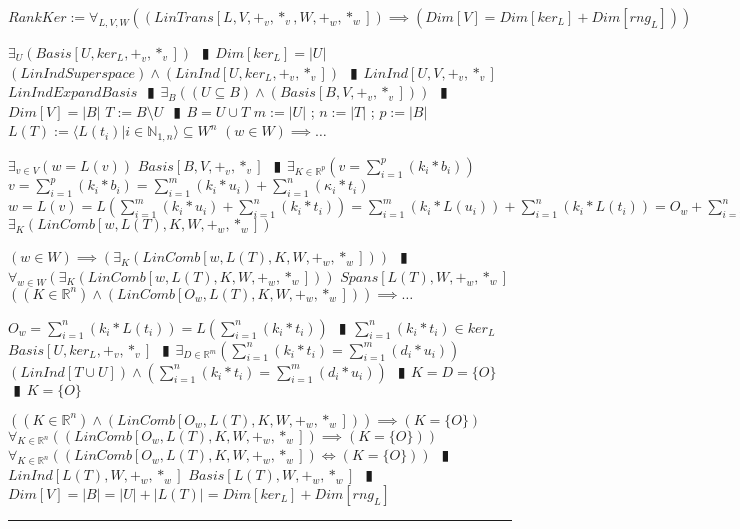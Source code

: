 \documentclass{book}
\newcommand{\abr}{:=}
\newcommand{\pipe}{$\phantom{(}\vrectangleblack\phantom{)}$}
\begin{document}
$RankKer \abr \forall_{L, V, W}((LinTrans[L, V, +_v, *_v, W, +_w, *_w]) \implies (Dim[V] = Dim[ker_L] + Dim[rng_L]))$
\begin{enumerate}
  \lit $\exists_{U}(Basis[U, ker_L, +_v, *_v])$ \pipe $Dim[ker_L] = |U|$
  \lit $(LinIndSuperspace) \land (LinInd[U, ker_L, +_v, *_v])$ \pipe $LinInd[U, V, +_v, *_v]$
  \lit $LinIndExpandBasis$ \pipe $\exists_{B}((U \subseteq B)\land (Basis[B, V, +_v, *_v]))$ \pipe $Dim[V] = |B|$
  \lit $T \abr B \setminus U$ \pipe $B = U \cup T$ 
  \lit $m \abr |U|$ ; $n \abr |T|$ ; $p \abr |B|$
  \lit $L(T) \abr \langle L(t_i) | i \in \mathbb{N}_{1, n} \rangle \subseteq W^n$
  \lit $(w \in W) \implies \ldots$
  \begin{enumerate}
    \lit $\exists_{v \in V}(w = L(v))$
    \lit $Basis[B, V, +_v, *_v]$ \pipe $\exists_{K \in \mathbb{R}^p}(v = \sum_{i = 1}^{p}(k_i * b_i))$
    \lit $v = \sum_{i = 1}^{p}(k_i * b_i) = \sum_{i = 1}^{m}(k_i * u_i) + \sum_{i = 1}^{n}(\kappa_i * t_i)$
    \lit $w = L(v) = L(\sum_{i = 1}^{m}(k_i * u_i) + \sum_{i = 1}^{n}(k_i * t_i)) = \sum_{i = 1}^{m}(k_i * L(u_i)) + \sum_{i = 1}^{n}(k_i * L(t_i)) = O_w + \sum_{i = 1}^{n}(k_i * L(t_i)) = \sum_{i = 1}^{n}(k_i * L(t_i))$
    \lit $\exists_{K}(LinComb[w, L(T), K, W, +_w, *_w])$
  \end{enumerate}
  \lit $(w \in W) \implies (\exists_{K}(LinComb[w, L(T), K, W, +_w, *_w]))$ \pipe $\forall_{w \in W}(\exists_{K}(LinComb[w, L(T), K, W, +_w, *_w]))$
  \lit $Spans[L(T), W, +_w, *_w]$
  \lit $((K \in \mathbb{R}^n) \land (LinComb[O_w, L(T), K, W, +_w, *_w])) \implies \ldots$
  \begin{enumerate}
    \lit $O_w = \sum_{i = 1}^{n}(k_i * L(t_i)) = L(\sum_{i = 1}^{n}(k_i * t_i))$ \pipe $\sum_{i = 1}^{n}(k_i * t_i) \in ker_L$ 
    \lit $Basis[U, ker_L, +_v, *_v]$ \pipe $\exists_{D \in \mathbb{R}^m}(\sum_{i = 1}^{n}(k_i * t_i) = \sum_{i = 1}^{m}(d_i * u_i))$
    \lit $(LinInd[T \cup U]) \land (\sum_{i = 1}^{n}(k_i * t_i) = \sum_{i = 1}^{m}(d_i * u_i))$ \pipe $K = D = \{O\}$ \pipe $K = \{O\}$
  \end{enumerate}
  \lit $((K \in \mathbb{R}^n) \land (LinComb[O_w, L(T), K, W, +_w, *_w])) \implies (K = \{O\})$
  \lit $\forall_{K \in \mathbb{R}^n}((LinComb[O_w, L(T), K, W, +_w, *_w]) \implies (K = \{O\}))$
  \lit $\forall_{K \in \mathbb{R}^n}((LinComb[O_w, L(T), K, W, +_w, *_w]) \iff (K = \{O\}))$ \pipe $LinInd[L(T), W, +_w, *_w]$
  \lit $Basis[L(T), W, +_w, *_w]$ \pipe $Dim[V] = |B| = |U| + |L(T)| = Dim[ker_L] + Dim[rng_L]$
\end{enumerate} \vspace{.75mm} \hrule \vspace{.75mm} \ \\ 
\end{document}
